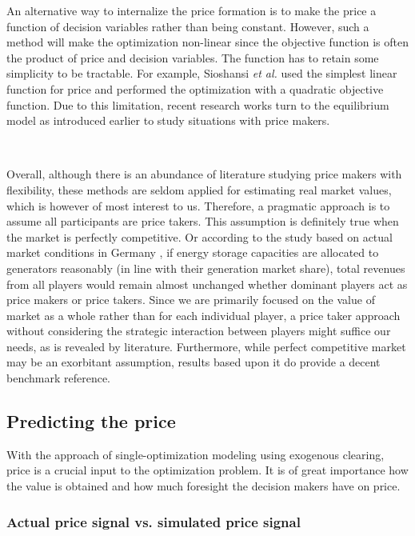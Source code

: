An alternative way to internalize the price formation is to make the price a function of decision variables rather than being constant. However, such a method will make the optimization non-linear since the objective function is often the product of price and decision variables. The function has to retain some simplicity to be tractable. For example, Sioshansi \textit{et al.} \cite{Sioshansi2009,Sioshansi2010} used the simplest linear function for price and performed the optimization with a quadratic objective function. Due to this limitation, recent research works turn to the equilibrium model as introduced earlier to study situations with price makers. 

~\newline

Overall, although there is an abundance of literature studying price makers with flexibility, these methods are seldom applied for estimating real market values, which is however of most interest to us. Therefore, a pragmatic approach is to assume all participants are price takers. This assumption is definitely true when the market is perfectly competitive. Or according to the study based on actual market conditions in Germany \cite{Schill2011}, if energy storage capacities are allocated to generators reasonably (in line with their generation market share), total revenues from all players would remain almost unchanged whether dominant players act as price makers or price takers. Since we are primarily focused on the value of market as a whole rather than for each individual player, a price taker approach without considering the strategic interaction between players might suffice our needs, as is revealed by literature. Furthermore, while perfect competitive market may be an exorbitant assumption,  results based upon it do provide a decent benchmark reference.

\subsection{Predicting the price}
\label{sec:lit-price}
With the approach of single-optimization modeling using exogenous clearing, price is a crucial input to the optimization problem. It is of great importance how the value is obtained and how much foresight the decision makers have on price.

\subsubsection{Actual price signal vs. simulated price signal}


